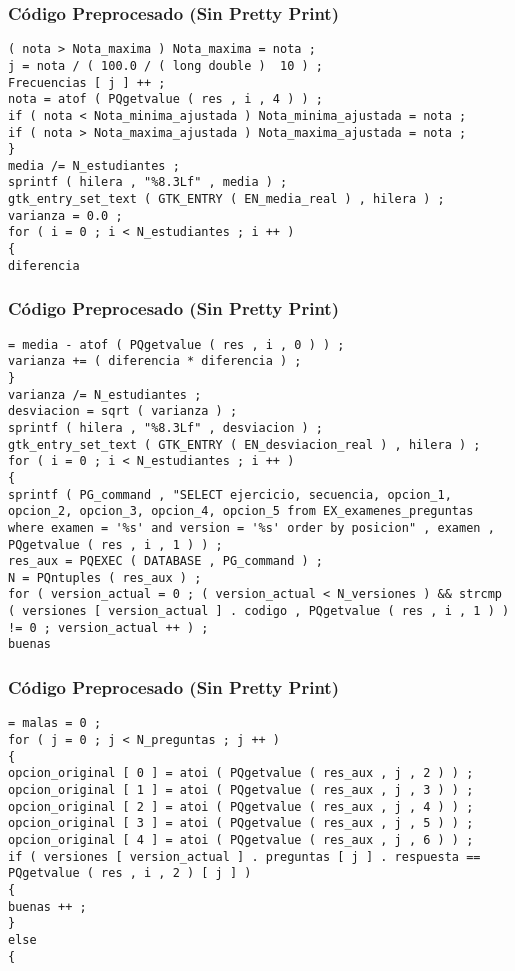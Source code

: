 \documentclass{beamer}
\begin{document}
\begin{frame}[fragile]
\frametitle{C\'odigo Preprocesado (Sin Pretty Print)}
\begin{lstlisting}[style=CStyle]
( nota > Nota_maxima ) Nota_maxima = nota ; 
j = nota / ( 100.0 / ( long double )  10 ) ; 
Frecuencias [ j ] ++ ; 
nota = atof ( PQgetvalue ( res , i , 4 ) ) ; 
if ( nota < Nota_minima_ajustada ) Nota_minima_ajustada = nota ; 
if ( nota > Nota_maxima_ajustada ) Nota_maxima_ajustada = nota ; 
} 
media /= N_estudiantes ; 
sprintf ( hilera , "%8.3Lf" , media ) ; 
gtk_entry_set_text ( GTK_ENTRY ( EN_media_real ) , hilera ) ; 
varianza = 0.0 ; 
for ( i = 0 ; i < N_estudiantes ; i ++ ) 
{ 
diferencia \end{lstlisting}
\end{frame}
\begin{frame}[fragile]
\frametitle{C\'odigo Preprocesado (Sin Pretty Print)}
\begin{lstlisting}[style=CStyle]
= media - atof ( PQgetvalue ( res , i , 0 ) ) ; 
varianza += ( diferencia * diferencia ) ; 
} 
varianza /= N_estudiantes ; 
desviacion = sqrt ( varianza ) ; 
sprintf ( hilera , "%8.3Lf" , desviacion ) ; 
gtk_entry_set_text ( GTK_ENTRY ( EN_desviacion_real ) , hilera ) ; 
for ( i = 0 ; i < N_estudiantes ; i ++ ) 
{ 
sprintf ( PG_command , "SELECT ejercicio, secuencia, opcion_1, opcion_2, opcion_3, opcion_4, opcion_5 from EX_examenes_preguntas where examen = '%s' and version = '%s' order by posicion" , examen , PQgetvalue ( res , i , 1 ) ) ; 
res_aux = PQEXEC ( DATABASE , PG_command ) ; 
N = PQntuples ( res_aux ) ; 
for ( version_actual = 0 ; ( version_actual < N_versiones ) && strcmp ( versiones [ version_actual ] . codigo , PQgetvalue ( res , i , 1 ) ) != 0 ; version_actual ++ ) ; 
buenas \end{lstlisting}
\end{frame}
\begin{frame}[fragile]
\frametitle{C\'odigo Preprocesado (Sin Pretty Print)}
\begin{lstlisting}[style=CStyle]
= malas = 0 ; 
for ( j = 0 ; j < N_preguntas ; j ++ ) 
{ 
opcion_original [ 0 ] = atoi ( PQgetvalue ( res_aux , j , 2 ) ) ; 
opcion_original [ 1 ] = atoi ( PQgetvalue ( res_aux , j , 3 ) ) ; 
opcion_original [ 2 ] = atoi ( PQgetvalue ( res_aux , j , 4 ) ) ; 
opcion_original [ 3 ] = atoi ( PQgetvalue ( res_aux , j , 5 ) ) ; 
opcion_original [ 4 ] = atoi ( PQgetvalue ( res_aux , j , 6 ) ) ; 
if ( versiones [ version_actual ] . preguntas [ j ] . respuesta == PQgetvalue ( res , i , 2 ) [ j ] ) 
{ 
buenas ++ ; 
} 
else 
{ \end{lstlisting}
\end{frame}
\end{document}
